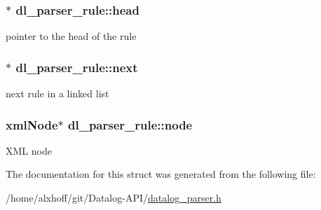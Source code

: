 \subsubsection[{\texorpdfstring{head}{head}}]{$\ast$ dl\+\_\+parser\+\_\+rule\+::head}\hypertarget{structdl__parser__rule_a5db876663753e120f3e9317bd50846f8}{}\label{structdl__parser__rule_a5db876663753e120f3e9317bd50846f8}
pointer to the head of the rule 
\subsubsection[{\texorpdfstring{next}{next}}]{$\ast$ dl\+\_\+parser\+\_\+rule\+::next}\hypertarget{structdl__parser__rule_a8cd9d240d0c0376f0613b84266b64eac}{}\label{structdl__parser__rule_a8cd9d240d0c0376f0613b84266b64eac}
next rule in a linked list 
\subsubsection[{\texorpdfstring{node}{node}}]{\setlength{\rightskip}{0pt plus 5cm}xml\+Node$\ast$ dl\+\_\+parser\+\_\+rule\+::node}\hypertarget{structdl__parser__rule_ab1344f0e0e232256a9de89baaf709466}{}\label{structdl__parser__rule_ab1344f0e0e232256a9de89baaf709466}
X\+ML node 

The documentation for this struct was generated from the following file\+:\begin{DoxyCompactItemize}
\item 
/home/alxhoff/git/\+Datalog-\/\+A\+P\+I/\hyperlink{datalog__parser_8h}{datalog\+\_\+parser.\+h}\end{DoxyCompactItemize}
